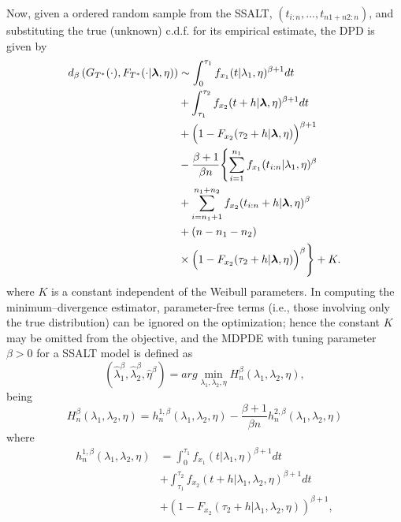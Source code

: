 \documentclass{article}
\begin{document}
Now, given a ordered random sample from the SSALT, $(t_{i:n}, ..., t_{n1+n2:n})$, and substituting the true (unknown) c.d.f. for its empirical estimate, the DPD is given by
\begin{align}
	d_{\beta}\left(G_{T^\ast}(\cdot), F_{T^\ast}(\cdot|\boldsymbol{\lambda},\eta)\right)&\sim 
\int_{0}^{\tau_1} f_{x_1}(t|\lambda_1,\eta)^{\beta+1} dt \nonumber
\\&+ \int_{\tau_1}^{\tau_2} f_{x_2}(t+h|\boldsymbol{\lambda},\eta)^{\beta+1} dt
\nonumber\\
&
+ \Bigl(1-F_{x_2}(\tau_2+h|\boldsymbol{\lambda},\eta)\Bigr)^{\beta+1}
\nonumber\\
&
- \frac{\beta+1}{\beta n} \Biggl\{
\sum_{i=1}^{n_1} f_{x_1}(t_{i:n}|\lambda_1,\eta)^\beta \nonumber
\\
& + \sum_{i=n_1+1}^{n_1+n_2} f_{x_2}(t_{i:n}+h|\boldsymbol{\lambda},\eta)^\beta
\nonumber\\
&
+ (n-n_1-n_2)  \nonumber
\\
& \times \Bigl(1-F_{x_2}(\tau_2+h|\boldsymbol{\lambda},\eta)\Bigr)^{\beta}
\Biggr\}
+ K.   \nonumber
\end{align}
where $K$ is a constant independent of the Weibull parameters. In computing the minimum–divergence estimator, parameter-free terms (i.e., those involving only the true distribution) can be ignored on the optimization; hence the constant $K$ may be omitted from the objective, and the MDPDE  with  tuning parameter $\beta >0$ for a SSALT model %
 is defined as
\begin{equation*}
\left(\hat{\lambda}_1^{\beta},\hat{\lambda}_2^{\beta},\hat{\eta}^{\beta}\right)=arg \min_{\lambda_1, \lambda_2,\eta}H_{n}^{\beta}\left(\lambda_1, \lambda_2,\eta\right),
\end{equation*}
being
\begin{equation} \label{eq:H_n}
H_{n}^{\beta}\left(\lambda_1, \lambda_2,\eta\right)=h_{n}^{1,\beta}\left(\lambda_1, \lambda_2,\eta\right) -\frac{\beta+1}{\beta n} h_{n}^{2,\beta}\left(\lambda_1, \lambda_2,\eta\right) %
\end{equation}
where
\begin{align*}
h_{n}^{1,\beta}\left(\lambda_1, \lambda_2,\eta\right)&=\int_{0}^{\tau_1} f_{x_1}\left(t|\lambda_1,\eta\right)^{\beta+1}dt
\\
&+\int_{\tau_1}^{\tau_2}f_{x_2}\left(t+h|\lambda_1,\lambda_2,\eta\right)^{\beta+1}dt
\\
&+\left(1-F_{x_2}\left(\tau_2+h|\lambda_1,\lambda_2,\eta\right)\right)^{\beta+1},
\end{align*}
\end{document}
